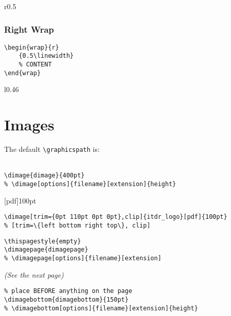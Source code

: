 \documentclass[itdr]{subfiles}
\begin{document}
\skipline
\lipsum[2]

\skipline
\lipsum[3]

\begin{wrap}{r}{0.5\linewidth}
\vspace{-\baselineskip}
\subsubsection{Right Wrap}
\begin{lstlisting}
\begin{wrap}{r}
	{0.5\linewidth}
	% CONTENT
\end{wrap}
\end{lstlisting}
\end{wrap}

\skipline
\lipsum[4]

\begin{wrap}[15]{l}{0.46\linewidth}
\end{wrap}

\skipline
\lipsum[5]

\vfill
\clearpage


\section{Images}


\break

The default \lstinline!\graphicspath! is:\\
\\

\vspace{-0.5ex}
\begin{lstlisting}
\dimage{dimage}{400pt}
% \dimage[options]{filename}[extension]{height}
\end{lstlisting}
\faHandPointLeft

\vfill

[pdf]{100pt}
\faHandPointUp
\begin{lstlisting}
\dimage[trim={0pt 110pt 0pt 0pt},clip]{itdr_logo}[pdf]{100pt}
% [trim=\{left bottom right top\}, clip]
\end{lstlisting}

\vfill

\begin{lstlisting}
\thispagestyle{empty}
\dimagepage{dimagepage}
% \dimagepage[options]{filename}[extension]
\end{lstlisting}
{\em (See the next page)}\hfill\faHandPointRight

\vfill

\begin{lstlisting}
% place BEFORE anything on the page
\dimagebottom{dimagebottom}{150pt}
% \dimagebottom[options]{filename}[extension]{height}
\end{lstlisting}
\faHandPointDown
\vspace{-3.5ex}

\break

\thispagestyle{empty}
\end{document}
